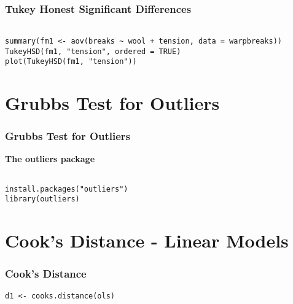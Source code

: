 \begin{frame}[fragile]
\frametitle{Tukey Honest Significant Differences}


\begin{framed}
\begin{verbatim}

summary(fm1 <- aov(breaks ~ wool + tension, data = warpbreaks))
TukeyHSD(fm1, "tension", ordered = TRUE)
plot(TukeyHSD(fm1, "tension"))

\end{verbatim}
\end{framed}

\end{frame}
\section*{Grubbs Test for Outliers}

\begin{frame}[fragile]
\frametitle{Grubbs Test for Outliers}

\textbf{The outliers package}
\begin{framed}
\begin{verbatim}

install.packages("outliers")
library(outliers)

\end{verbatim}
\end{framed}

\end{frame}
\section*{Cook's Distance - Linear Models}


\begin{frame}[fragile]
\frametitle{Cook's Distance}

\begin{framed}
\begin{verbatim}
d1 <- cooks.distance(ols)
\end{verbatim}
\end{framed}

\end{frame}
